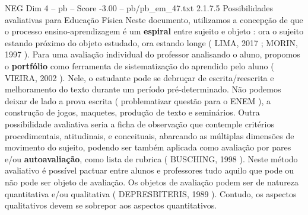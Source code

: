\begin{textsample}{NEG Dim 4 – pb – Score -3.00 – pb/pb\_em\_47.txt}  \label{ex:f4_neg_022}
2.1.7.5 Possibilidades avaliativas para Educação Física Neste documento, utilizamos a concepção de que o processo ensino-aprendizagem é um \textbf{espiral} entre sujeito e objeto : ora o sujeito estando próximo do objeto estudado, ora estando longe ( LIMA, 2017 ; MORIN, 1997 ).
Para uma avaliação individual do professor analisando o aluno, propomos o \textbf{portfólio} como ferramenta de sistematização do aprendido pelo aluno ( VIEIRA, 2002 ).
Nele, o estudante pode se debruçar de escrita/reescrita e melhoramento do texto durante um período pré-determinado.
Não podemos deixar de lado a prova escrita ( problematizar questão para o ENEM ), a construção de jogos, maquetes, produção de texto e seminários.
Outra possibilidade avaliativa seria a ficha de observação que contemple critérios procedimentais, atitudinais, e conceituais, abarcando as múltiplas dimensões de movimento do sujeito, podendo ser também aplicada como avaliação por pares e/ou \textbf{autoavaliação}, como lista de rubrica ( BUSCHING, 1998 ).
Neste método avaliativo é possível pactuar entre alunos e professores tudo aquilo que pode ou não pode ser objeto de avaliação.
Os objetos de avaliação podem ser de natureza quantitativa e/ou qualitativa ( DEPRESBITERIS, 1989 ).
Contudo, os aspectos qualitativos devem se sobrepor aos aspectos quantitativos.

\end{textsample}
